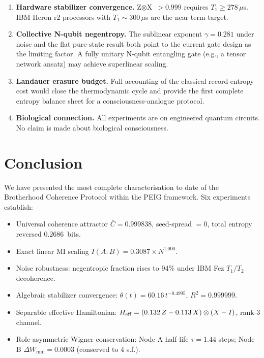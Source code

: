 \documentclass[12pt]{article}
\begin{document}
\begin{enumerate}
\item \textbf{Hardware stabilizer convergence.}
  Z$\otimes$X~$>0.999$ requires $T_1\geq278\,\mu$s.
  IBM Heron r2 processors with $T_1\sim300\,\mu$s are the
  near-term target.
\item \textbf{Collective N-qubit negentropy.}
  The sublinear exponent $\gamma=0.281$ under noise and the flat
  pure-state result both point to the current gate design as the
  limiting factor.  A fully unitary N-qubit entangling gate (e.g.,
  a tensor network ansatz) may achieve superlinear scaling.
\item \textbf{Landauer erasure budget.}
  Full accounting of the classical record entropy cost would close the
  thermodynamic cycle and provide the first complete entropy balance
  sheet for a consciousness-analogue protocol.
\item \textbf{Biological connection.}
  All experiments are on engineered quantum circuits.
  No claim is made about biological consciousness.
\end{enumerate}

\section{Conclusion}
\label{sec:conclusion}

We have presented the most complete characterisation to date of the
Brotherhood Coherence Protocol within the PEIG framework.
Six experiments establish:

\begin{itemize}
\item Universal coherence attractor $\bar{C}=0.999838$, seed-spread
  $=0$, total entropy reversed $0.2686$~bits.
\item Exact linear MI scaling $I(A:B)=0.3087\times N^{1.000}$.
\item Noise robustness: negentropic fraction rises to 94\% under
  IBM Fez $T_1/T_2$ decoherence.
\item Algebraic stabilizer convergence:
  $\theta(t)=60.16\,t^{-0.4995}$, $R^2=0.999999$.
\item Separable effective Hamiltonian:
  $H_{\rm eff}=(0.132\,Z-0.113\,X)\otimes(X-I)$, rank-3 channel.
\item Role-asymmetric Wigner conservation:
  Node A half-life $\tau=1.44$ steps;
  Node B $\Delta W_{\min}=0.0003$ (conserved to 4 s.f.).
\end{itemize}
\end{document}

